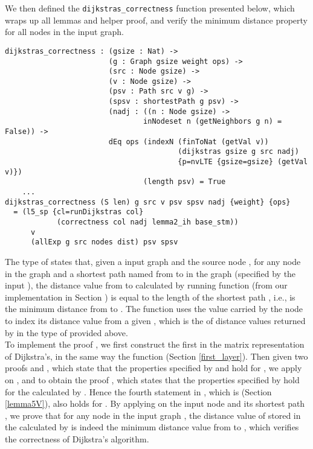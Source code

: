 We then defined the \texttt{dijkstras\_correctness} function presented below, which wraps up all lemmas and helper proof, and verify the minimum distance property for all nodes in the input graph. 
\\
\begin{lstlisting}
dijkstras_correctness : (gsize : Nat) ->
                        (g : Graph gsize weight ops) ->
                        (src : Node gsize) ->
                        (v : Node gsize) ->
                        (psv : Path src v g) ->
                        (spsv : shortestPath g psv) ->
                        (nadj : ((n : Node gsize) -> 
                        		inNodeset n (getNeighbors g n) = False)) ->
                        dEq ops (indexN (finToNat (getVal v)) 
                        				(dijkstras gsize g src nadj) 
                        				{p=nvLTE {gsize=gsize} (getVal v)}) 
                        		(length psv) = True
    ... 
dijkstras_correctness (S len) g src v psv spsv nadj {weight} {ops}
  = (l5_sp {cl=runDijkstras col} 
            (correctness col nadj lemma2_ih base_stm)) 
      v 
      (allExp g src nodes dist) psv spsv
\end{lstlisting}


The type of  states that, given a input graph  and the source node , for any node  in the graph and a shortest path named  from  to  in the graph (specified by the input ), the distance value from  to  calculated by running  function (from our implementation in Section ) is equal to the length of the shortest path , i.e., is the minimum distance from  to . The function  uses the value carried by the node  to index its distance value from a given , which is the  of distance values returned by  in the type of  provided above. 
\\

To implement the proof , we first construct the first   in the matrix representation of Dijkstra's, in the same way the  function (Section \ref{first_layer}). Then given two proofs  and , which state that the properties specified by  and  hold for , we apply  on , and  to obtain the proof , which states that the properties specified by  hold for the  calculated by . Hence the fourth statement in , which is (Section \ref{lemma5V}), also holds for . By applying  on the input node  and its shortest path , we prove that for any node  in the input graph , the distance value of  stored in the  calculated by  is indeed the minimum distance value from  to , which verifies the correctness of Dijkstra's algorithm. 
\\

